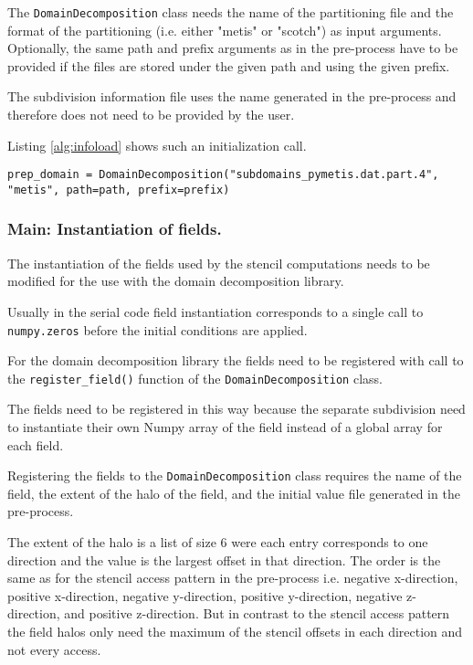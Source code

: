 The \texttt{DomainDecomposition} class needs the name of the partitioning file and the format of the partitioning (i.e. either "metis" or "scotch") as input arguments.
Optionally, the same path and prefix arguments as in the pre-process have to be provided if the files are stored under the given path and using the given prefix.

The subdivision information file uses the name generated in the pre-process and therefore does not need to be provided by the user.

Listing \ref{alg:infoload} shows such an initialization call.

\begin{lstlisting}[caption={Example code for the loading of the domain decomposition information.},captionpos=b, label={alg:infoload}, float, floatplacement=H]
prep_domain = DomainDecomposition("subdomains_pymetis.dat.part.4", "metis", path=path, prefix=prefix)
\end{lstlisting}

\subsubsection{Main: Instantiation of fields.}
The instantiation of the fields used by the stencil computations needs to be modified for the use with the domain decomposition library.

Usually in the serial code field instantiation corresponds to a single call to \texttt{numpy.zeros} before the initial conditions are applied.

For the domain decomposition library the fields need to be registered with call to the \texttt{register\_field()} function of the \texttt{DomainDecomposition} class.

The fields need to be registered in this way because the separate subdivision need to instantiate their own Numpy array of the field instead of a global array for each field.

Registering the fields to the \texttt{DomainDecomposition} class requires the name of the field, the extent of the halo of the field, and the initial value file generated in the pre-process.

The extent of the halo is a list of size 6 were each entry corresponds to one direction and the value is the largest offset in that direction.
The order is the same as for the stencil access pattern in the pre-process i.e. negative x-direction, positive x-direction, negative y-direction, positive y-direction, negative z-direction, and positive z-direction.
But in contrast to the stencil access pattern the field halos only need the maximum of the stencil offsets in each direction and not every access.

